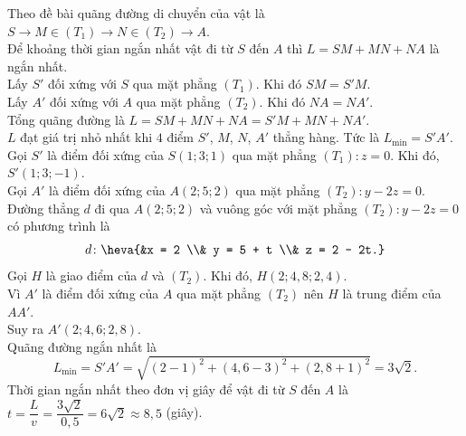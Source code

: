 \begin{ex}
{\begin{center}
		\end{center}
		Theo đề bài quãng đường di chuyển của vật là
		$S \to M \in (T_1) \to N \in (T_2) \to A$.\\
		Để khoảng thời gian ngắn nhất vật đi từ $S$ đến $A$ thì
		$L= SM + MN + NA$ là ngắn nhất.\\
		Lấy $S'$ đối xứng với $S$ qua mặt phẳng $(T_1)$. Khi đó $SM = S'M$.\\
		Lấy $A'$ đối xứng với $A$ qua mặt phẳng $(T_2)$. Khi đó $NA = NA'$.\\
		Tổng quãng đường là $L = SM + MN + NA = S'M + MN + NA'$.\\
		$L$ đạt giá trị nhỏ nhất khi $4$ điểm $S'$, $M$, $N$, $A'$ thẳng hàng. Tức là $L_{\min} = S'A'$.\\
		Gọi $S'$ là điểm đối xứng của $S(1;3;1)$ qua mặt phẳng $\left(T_{1}\right)\colon z = 0$. Khi đó, $S'(1;3;-1)$.\\
		Gọi $A'$ là điểm đối xứng của $A(2; 5; 2)$ qua mặt phẳng $\left(T_{2}\right)\colon y-2z = 0$.\\
		Đường thẳng $d$ đi qua $A(2; 5; 2)$ và vuông góc với mặt phẳng $(T_{2})\colon y-2z = 0$ có phương trình là
		\[d\colon \heva{&x = 2 \\& y = 5 + t \\& z = 2 - 2t.}\]
		Gọi $H$ là giao điểm của $d$ và $(T_2)$. Khi đó, $H(2; 4{,}8; 2{,}4)$.\\
		Vì $A'$ là điểm đối xứng của $A$ qua mặt phẳng $\left(T_{2}\right)$ nên $H$ là trung điểm của $AA'$.\\
		Suy ra $A'(2; 4{,}6; 2{,}8)$.\\
		Quãng đường ngắn nhất là
		\[L_{\min}=S'A'=\sqrt{(2-1)^2+(4{,}6-3)^2+(2{,}8+1)^2 }=3\sqrt{2}.\]
		Thời gian ngắn nhất theo đơn vị giây để vật đi từ $S$ đến $A$ là $t = \dfrac{L}{v} = \dfrac{3\sqrt{2}}{0{,}5} = 6\sqrt{2}\approx 8{,}5$ (giây).
	}
\end{ex}

